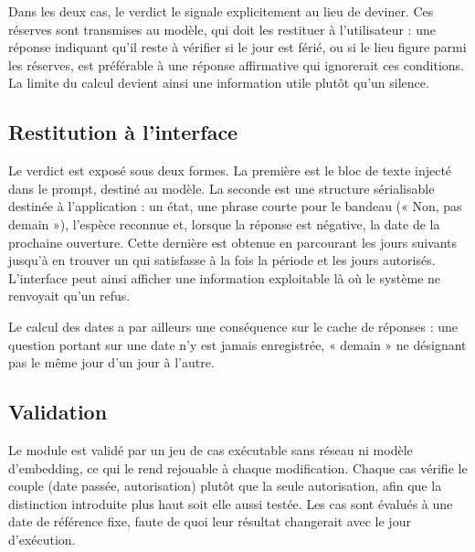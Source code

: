 Dans les deux cas, le verdict le signale explicitement au lieu de deviner. Ces
réserves sont transmises au modèle, qui doit les restituer à l'utilisateur : une
réponse indiquant qu'il reste à vérifier si le jour est férié, ou si le lieu
figure parmi les réserves, est préférable à une réponse affirmative qui
ignorerait ces conditions. La limite du calcul devient ainsi une information
utile plutôt qu'un silence.

\subsection{Restitution à l'interface}

Le verdict est exposé sous deux formes. La première est le bloc de texte injecté
dans le prompt, destiné au modèle. La seconde est une structure sérialisable
destinée à l'application : un état, une phrase courte pour le bandeau
(« Non, pas demain »), l'espèce reconnue et, lorsque la réponse est négative, la
date de la prochaine ouverture. Cette dernière est obtenue en parcourant les
jours suivants jusqu'à en trouver un qui satisfasse à la fois la période et les
jours autorisés. L'interface peut ainsi afficher une information exploitable là
où le système ne renvoyait qu'un refus.

Le calcul des dates a par ailleurs une conséquence sur le cache de réponses :
une question portant sur une date n'y est jamais enregistrée, « demain » ne
désignant pas le même jour d'un jour à l'autre.

\subsection{Validation}

Le module est validé par un jeu de cas exécutable sans réseau ni modèle
d'embedding, ce qui le rend rejouable à chaque modification. Chaque cas vérifie
le couple (date passée, autorisation) plutôt que la seule autorisation, afin que
la distinction introduite plus haut soit elle aussi testée. Les cas sont évalués
à une date de référence fixe, faute de quoi leur résultat changerait avec le jour
d'exécution.

